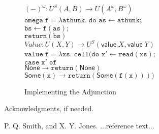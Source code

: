 \documentclass[preprint]{sigplanconf}
\newcommand{\term}[1]{\ensuremath{\mathtt{{#1}}}}
\newcommand{\valtype}[1]{\mathsf{value}\;{#1}}
\newcommand{\None}{\mathsf{None}}
\newcommand{\Some}[1]{\mathsf{Some}({#1})}
\begin{document}
\begin{figure}
\begin{tabbing}
$(-)^\omega : U^S(A,B) \to U(A^\omega, B^\omega)$ \\
\term{omega\;f = \lambda athunk.\;do} \=\term{as \leftarrow athunk;} \\
                                      \>\term{bs \leftarrow f(as);} \\
                                      \>\term{return(bs)} 
\\[1em]

$\mathit{Value} : U(X,Y) \to U^S(\valtype{X}, \valtype{Y})$ \\[0.2em]
\term{value\;f = \lambda xs.\;cell(do} \=\term{x' \leftarrow read(xs);}\\
                                       \>\term{case\;x'\;of}\\
                                       \>\;\;\=\term{\None \to return(\None)} \\
                                       \>\>    \term{\Some{x} \to return(\Some{f(x)}))}

  
\end{tabbing}
\caption{Implementing the Adjunction}
\label{adjoint-implementation}  
\end{figure}


\acks

Acknowledgments, if needed.





\begin{thebibliography}{}
\softraggedright

P. Q. Smith, and X. Y. Jones. ...reference text...

\end{thebibliography}
\end{document}

